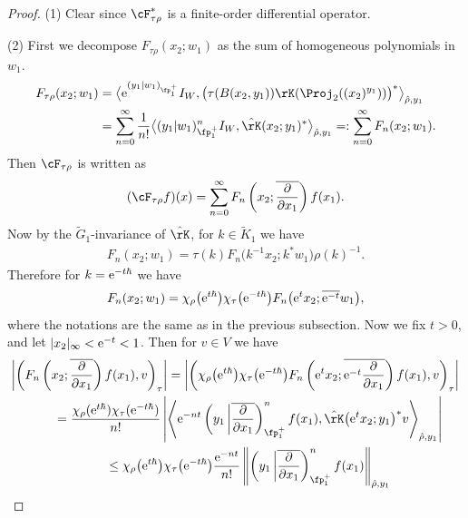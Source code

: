 \begin{proof}
(1) Clear since $\cF_{\tau\rho}^*$ is a finite-order differential operator.

(2) First we decompose $F_{\tau\rho}(x_2;w_1)$ as the sum of homogeneous polynomials in $w_1$.
\begin{align*}
F_{\tau\rho}(x_2;w_1) &=\big\langle {\rm e}^{(y_1|w_1)_{\fp^+_1}}I_W,\bigl(\tau(B(x_2,y_1))\rK(\Proj_2((x_2)^{y_1}))\bigr)^*\big\rangle_{\hat{\rho},y_1} \\
&=\sum_{n=0}^\infty \frac{1}{n!}\big\langle (y_1|w_1)_{\fp^+_1}^nI_W, \hat{\rK}(x_2;y_1)^*\big\rangle_{\hat{\rho},y_1} =:\sum_{n=0}^\infty F_n(x_2;w_1).
\end{align*}
Then $\cF_{\tau\rho}$ is written as
\begin{gather*} (\cF_{\tau\rho}f)(x)=\sum_{n=0}^\infty F_n\left(x_2;\overline{\frac{\partial}{\partial x_1}}\right)f(x_1). \end{gather*}
Now by the $\tilde{G}_1$-invariance of $\hat{\rK}$, for $k\in \tilde{K}_1$ we have
\begin{gather*} F_n(x_2;w_1)=\tau(k)F_n\big(k^{-1}x_2;k^*w_1\big)\rho(k)^{-1}. \end{gather*}
Therefore for $k={\rm e}^{-t\hbar}$ we have
\begin{gather}\label{invariance_Fn}
F_n(x_2;w_1)=\chi_\rho\big({\rm e}^{t\hbar}\big)\chi_\tau\big({\rm e}^{-t\hbar}\big) F_n\big({\rm e}^tx_2;\overline{{\rm e}^{-t}}w_1\big),
\end{gather}
where the notations are the same as in the previous subsection.
Now we fix $t>0$, and let $|x_2|_\infty<{\rm e}^{-t}<1$. Then for $v\in V$ we have
\begin{gather*}
 \left|\left(F_n\left(x_2;\overline{\frac{\partial}{\partial x_1}}\right)f(x_1),v\right)_\tau\right| =\left|\left(\chi_\rho\big({\rm e}^{t\hbar}\big)\chi_\tau\big({\rm e}^{-t\hbar}\big)
F_n\left({\rm e}^tx_2;\overline{{\rm e}^{-t}\frac{\partial}{\partial x_1}}\right)f(x_1),v\right)_\tau\right| \\
\qquad{} =\frac{\chi_\rho({\rm e}^{t\hbar})\chi_\tau({\rm e}^{-t\hbar})}{n!}\left|\left\langle {\rm e}^{-nt}
\left(y_1\,\middle|\overline{\frac{\partial}{\partial x_1}}\right)_{\fp^+_1}^nf(x_1),
\hat{\rK}\big({\rm e}^tx_2;y_1\big)^*v\right\rangle_{\hat{\rho},y_1}\right| \\
\qquad{} \le \chi_\rho\big({\rm e}^{t\hbar}\big)\chi_\tau\big({\rm e}^{-t\hbar}\big)\frac{{\rm e}^{-nt}}{n!}
\left\Vert\left(y_1\,\middle|\overline{\frac{\partial}{\partial x_1}}\right)_{\fp^+_1}^nf(x_1)\right\Vert_{\hat{\rho},y_1}

\end{gather*}
\end{proof}
